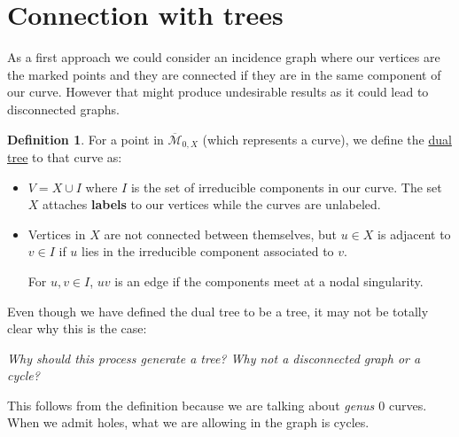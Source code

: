 \documentclass[11pt]{article}
\newcommand{\ov}{\overline}        %
\newcommand{\cM}{\mathcal{M}}           %
\theoremstyle{definition}
\newtheorem{Def}{Definition}           %
\theoremstyle{remark}
\numberwithin{theorem}{section}
\begin{document}
\section{Connection with trees}

As a first approach we could consider an incidence graph where our vertices are the marked points and they are connected if they are in the same component of our curve. However that might produce undesirable results as it could lead to disconnected graphs.

\begin{Def}
For a point in $\ov{\cM}_{0,X}$ (which represents a curve), we define the \underline{dual tree} to that curve as:
\begin{itemize}
    \item $V=X\cup I$ where $I$ is the set of irreducible components in our curve. The set $X$ attaches \textbf{labels} to our vertices while the curves are unlabeled.
    \item Vertices in $X$ are not connected between themselves, but $u\in X$ is adjacent to $v\in I$ if $u$ lies in the irreducible component associated to $v$.\par 
    For $u,v\in I$, $uv$ is an edge if the components meet at a nodal singularity.
\end{itemize}
\end{Def}

Even though we have defined the dual tree to be a tree, it may not be totally clear why this is the case: %
\begin{center}\begin{minipage}{0.9\textwidth}\centering\em
    Why should this process generate a tree? Why not a disconnected graph or a cycle?
\end{minipage}\end{center}
This follows from the definition because we are talking about \emph{genus $0$} curves. When we admit holes, what we are allowing in the graph is cycles.
\end{document}

